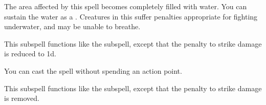 
The area affected by this spell becomes completely filled with water.
You can sustain the water as a .
Creatures in this  suffer penalties appropriate for fighting underwater, and may be unable to breathe.







This subspell functions like the  subspell, except that the penalty to strike damage is reduced to \minus1d.






You can cast the spell without spending an action point.






This subspell functions like the  subspell, except that the penalty to strike damage is removed.





